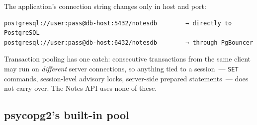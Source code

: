 \begin{codebox}[short]

\begin{Shaded}
\begin{Highlighting}[]
\KeywordTok{[databases]}
\OtherTok{=}

\KeywordTok{[pgbouncer]}
\OtherTok{=}
\OtherTok{=}
\OtherTok{=}
\OtherTok{=}
\OtherTok{=}
\OtherTok{=}\StringTok{ }
\OtherTok{=}\StringTok{ }
\end{Highlighting}
\end{Shaded}

\end{codebox}

\noindent{}The application's connection string changes only in host and port:

\begin{outputbox}[short]
\begin{Verbatim}[fontsize=\codesize, breaklines, breakanywhere, breaksymbolleft={\tiny\textcolor{muted}{$\hookrightarrow$}}]
postgresql://user:pass@db-host:5432/notesdb        → directly to PostgreSQL
postgresql://user:pass@db-host:6432/notesdb        → through PgBouncer
\end{Verbatim}
\end{outputbox}

\noindent{}Transaction pooling has one catch: consecutive transactions from the same client may run on \emph{different} server connections, so anything tied to a session~--- \texttt{SET} commands, session-level advisory locks, server-side prepared statements~--- does not carry over. The Notes API uses none of these.

\subsection*{psycopg2's built-in pool}\label{36-scaling-load:psycopg2s-built-in-pool}

